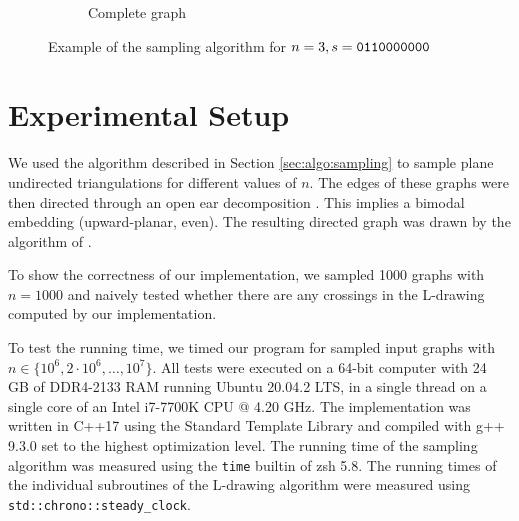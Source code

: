 \documentclass[a4paper]{article}
\begin{document}
\begin{figure}[ht]
\begin{subfigure}{0.23\textwidth}
        \caption{Complete graph}
        \label{fig:sample:done}
    \end{subfigure}
    \caption{Example of the sampling algorithm for $n = 3, s = \tt0110000000$}
    \label{fig:sample}
\end{figure}

\section{Experimental Setup}\label{sec:setup}
We used the algorithm described in Section \ref{sec:algo:sampling} to sample
plane undirected triangulations for different values of $n$.
The edges of these graphs were then directed through an open ear
decomposition \cite{openear}.
This implies a bimodal embedding (upward-planar, even).
The resulting directed graph was drawn by the algorithm of \citet{ldrawing}.

To show the correctness of our implementation, we sampled 1000 graphs with
$n=1000$ and naively tested whether there are any crossings in the L-drawing
computed by our implementation.

To test the running time, we timed our program for sampled input graphs with
$n \in \{10^6, 2 \cdot 10^6, \dots, 10^7\}$.
All tests were executed on a 64-bit computer with 24 GB of DDR4-2133 RAM running
Ubuntu 20.04.2 LTS, in a single thread on a single core of an Intel i7-7700K CPU
@ 4.20 GHz.
The implementation was written in C++17 using the Standard Template Library and
compiled with g++ 9.3.0 set to the highest optimization level.
The running time of the sampling algorithm was measured using the {\tt time}
builtin of zsh 5.8.
The running times of the individual subroutines of the L-drawing algorithm were
measured using {\tt std::chrono::steady\_clock}.
\end{document}
